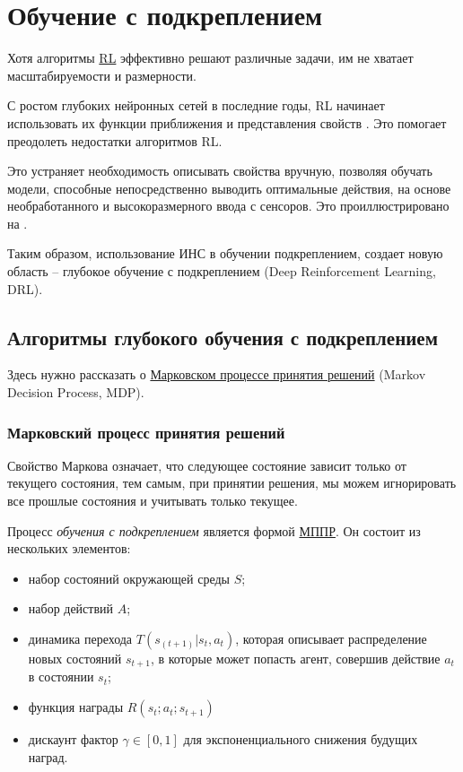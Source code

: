 \section{Обучение с подкреплением} \label{ch1:rl}

Хотя алгоритмы \hyperref[acr:rl]{RL} эффективно решают различные задачи, им не хватает масштабируемости и размерности.

С ростом глубоких нейронных сетей в последние годы, RL начинает использовать их функции приближения и представления свойств \cite{HORNIK1991251}. Это помогает преодолеть недостатки алгоритмов RL.

Это устраняет необходимость описывать свойства вручную, позволяя обучать модели, способные непосредственно выводить оптимальные действия, на основе необработанного и высокоразмерного ввода с сенсоров. Это проиллюстрировано на .

Таким образом, использование ИНС в обучении подкреплением, создает новую область – глубокое обучение с подкреплением (Deep Reinforcement Learning, DRL).


\subsection{Алгоритмы глубокого обучения с подкреплением}

Здесь нужно рассказать о \hyperref[acr:mdp]{Марковском процессе принятия решений} (Markov Decision Process, MDP).

\subsubsection{Марковский процесс принятия решений}

Свойство Маркова означает, что следующее состояние зависит только от текущего состояния, тем самым, при принятии решения, мы можем игнорировать все прошлые состояния и учитывать только текущее.

Процесс {\itshape обучения с подкреплением} является формой \hyperref[acr:mdp]{МППР}. Он состоит из нескольких элементов:

\begin{itemize}
	\item набор состояний окружающей среды $S$;
	\item набор действий $A$;
	\item динамика перехода $T(s_{(t+1)}|s_t, a_t)$, которая описывает распределение новых состояний $s_{t+1}$, в которые может попасть агент, совершив действие $a_t$ в состоянии $s_t$;
	\item функция награды $R(s_t; a_t; s_{t+1})$
	\item дискаунт фактор $\gamma \in [0, 1]$ для экспоненциального снижения будущих наград.
\end{itemize}

